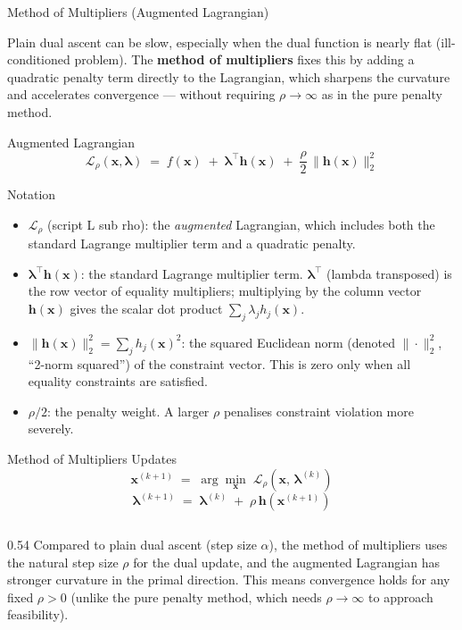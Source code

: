 \documentclass[aspectratio=169,10pt]{beamer}
\newcommand{\bx}{\mathbf{x}}
\newcommand{\bh}{\mathbf{h}}
\newcommand{\blam}{\boldsymbol{\lambda}}
\newcommand{\calL}{\mathcal{L}}
\begin{document}
\begin{frame}[allowframebreaks]{Method of Multipliers (Augmented Lagrangian)}

  Plain dual ascent can be slow, especially when the dual function is nearly
  flat (ill-conditioned problem).  The \textbf{method of multipliers} fixes
  this by adding a quadratic penalty term directly to the Lagrangian, which
  sharpens the curvature and accelerates convergence --- without requiring
  $\rho \to \infty$ as in the pure penalty method.

  \begin{block}{Augmented Lagrangian}
    \[
      \calL_\rho(\bx, \blam) \;=\;
      f(\bx) \;+\; \blam^\top \bh(\bx) \;+\;
      \frac{\rho}{2}\,\|\bh(\bx)\|_2^2
    \]
  \end{block}

  \begin{block}{Notation}
    \begin{itemize}
      \item $\calL_\rho$ (script L sub rho): the \emph{augmented} Lagrangian,
            which includes both the standard Lagrange multiplier term and a
            quadratic penalty.
      \item $\blam^\top \bh(\bx)$: the standard Lagrange multiplier term.
            $\blam^\top$ (lambda transposed) is the row vector of equality
            multipliers; multiplying by the column vector $\bh(\bx)$ gives
            the scalar dot product $\sum_j \lambda_j h_j(\bx)$.
      \item $\|\bh(\bx)\|_2^2 = \sum_j h_j(\bx)^2$: the squared Euclidean
            norm (denoted $\|\cdot\|_2^2$, ``2-norm squared'') of the
            constraint vector.  This is zero only when all equality
            constraints are satisfied.
      \item $\rho/2$: the penalty weight.  A larger $\rho$ penalises
            constraint violation more severely.
    \end{itemize}
  \end{block}

  \begin{block}{Method of Multipliers Updates}
    \[
      \bx^{(k+1)} \;=\; \arg\min_{\bx}\; \calL_\rho\!\left(\bx,\, \blam^{(k)}\right)
    \]
    \[
      \blam^{(k+1)} \;=\; \blam^{(k)} \;+\; \rho\, \bh\!\left(\bx^{(k+1)}\right)
    \]
  \end{block}

  \begin{columns}
    \begin{column}{0.54\textwidth}
      Compared to plain dual ascent (step size $\alpha$), the method of
      multipliers uses the natural step size $\rho$ for the dual update,
      and the augmented Lagrangian has stronger curvature in the primal
      direction.  This means convergence holds for any fixed $\rho > 0$
      (unlike the pure penalty method, which needs $\rho \to \infty$
      to approach feasibility).


\end{column}
\end{columns}
\end{frame}
\end{document}
